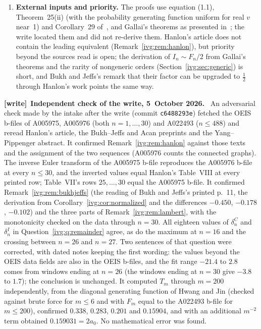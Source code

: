 \documentclass[11pt,letterpaper]{article}
\theoremstyle{definition}\newtheorem{definition}[theorem]{Definition}
\theoremstyle{remark}\newtheorem{remark}[theorem]{Remark}
\newcommand{\file}[1]{\nolinkurl{#1}}
\newenvironment{writenote}[1][]{\par\smallskip\begingroup\small
 \noindent\textbf{[write]}\if\relax\detokenize{#1}\relax\else~\textbf{#1.}\fi\ }%
 {\par\endgroup\smallskip}
\begin{document}
\begin{enumerate}
 \eqref{ivg:eq:factorial} the coefficient of $n^{-2}$ is not evaluated;
 Corollary~\ref{ivg:cor:Frelativeconstant} gives the nonlogarithmic
 coefficients in the $F_n/2$ normalization. Missing: the second coefficient of
 the Fishburn expansion, which (1.1) of~\cite{HJ} as cited does not print,
 and the bookkeeping that combines it with
 Corollary~\ref{ivg:cor:Frelativeconstant}.
\item\label{ivg:q:external} \textbf{External inputs and priority.} The proofs
 use equation (1.1), Theorem~25(ii) (with the probability generating
 function uniform for real $v$ near~1) and Corollary~29 of~\cite{HJ}, and
 Gallai's theorems as presented in~\cite{Gallai}; the write located them and
 did not re-derive them. Hanlon's article does not contain the leading
 equivalent (Remark~\ref{ivg:rem:hanlon}), but priority beyond the sources
 read is open; the derivation of $I_n\sim F_n/2$ from Gallai's theorems and
 the rarity of nongeneric orders (Section~\ref{ivg:sec:generic}) is short,
 and Bukh and Jeffs's remark that their factor can be upgraded to
 $\tfrac12$ through Hanlon's work points the same way.
\end{enumerate}
\begin{writenote}[Independent check of the write, 5~October 2026]
An adversarial check made by the intake after the write (commit
\file{c6488293e}) fetched the OEIS b-files of A005975, A005976 (both
$n=1,\dots,30$) and A022493 ($n\le488$) and reread Hanlon's article, the
Bukh--Jeffs and Acan preprints and the Yang--Pippenger abstract. It confirmed
Remark~\ref{ivg:rem:hanlon} against those texts and the assignment of the two
sequences (A005976 counts the connected graphs). The inverse Euler transform
of the A005975 b-file reproduces the A005976 b-file at every $n\le30$, and
the inverted values equal Hanlon's Table~VIII at every printed row; Table~VII's
rows $25,\dots,30$ equal the A005975 b-file. It confirmed
Remark~\ref{ivg:rem:bukhjeffs} (the reading of Bukh and Jeffs's printed
p.~11, the derivation from Corollary~\ref{ivg:cor:normalized} and the
differences $-0.450$, $-0.178$, $-0.102$) and the three parts of
Remark~\ref{ivg:rem:lambert}, with the monotonicity checked on the data
through $n=30$. All eighteen values of $\delta^C_n$ and $\delta^I_n$ in
Question~\ref{ivg:q:remainder} agree, as do the maximum at $n=16$ and the
crossing between $n=26$ and $n=27$. Two sentences of that question were
corrected, with dated notes keeping the first wording: the values beyond the
OEIS data fields are also in the OEIS b-files, and the fit range $-21.4$ to
$2.8$ comes from windows ending at $n=26$ (the windows ending at $n=30$ give
$-3.8$ to $1.7$); the conclusion is unchanged. It computed $T_m$ through
$m=200$ independently, from the diagonal generating function of
Hwang and Jin (checked against brute force for $m\le6$ and with $F_m$ equal to
the A022493 b-file for $m\le200$), confirmed $0.338$, $0.283$, $0.201$ and
$0.15904$, and with an additional $m^{-2}$ term obtained $0.159031=2a_0$.
No mathematical error was found.
\end{writenote}
\end{document}
